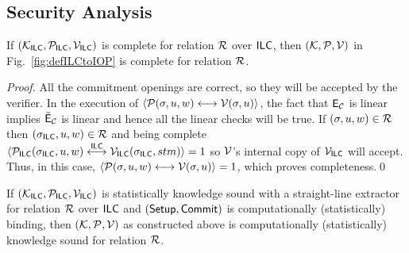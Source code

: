\subsection{Security Analysis}
\label{sec:IPCPsec}
    \begin{theorem}[Completeness]
    If $(\mathcal{K}_{\mathsf{ILC}},\mathcal{P}_{\mathsf{ILC}},\mathcal{V}_{\mathsf{ILC}})$ is complete for relation $\mathcal{R}$ over $\mathsf{ILC}$, then $(\mathcal{K},\mathcal{P},\mathcal{V})$ in Fig.~\ref{fig:defILCtoIOP} is complete for relation $\mathcal{R}$.
    \end{theorem}  
   \begin{proof}
All the commitment openings are correct, so they will be accepted by the verifier. In the execution of $\langle \mathcal{P}(\mathsf{\sigma},u,w)\longleftrightarrow\mathcal{V}(\mathsf{\sigma},u)\rangle$, the fact that $\mathsf{E}_{\mathcal{C}}$ is linear implies $\tilde{\mathsf{E}}_{\mathcal{C}}$ is linear and hence all the linear checks will be true. If $(\mathsf{\sigma},u,w)\in \mathcal{R}$ then $(\mathsf{\sigma}_{\mathsf{ILC}},u,w)\in \mathcal{R}$ and being complete $\langle \mathcal{P}_{\mathsf{ILC}}(\mathsf{\sigma}_{\mathsf{ILC}},u,w)\overset{\mathsf{ILC}}{\longleftrightarrow}\mathcal{V}_{\mathsf{ILC}}(\mathsf{\sigma}_{\mathsf{ILC}},stm)\rangle =1$ so $\mathcal{V}$'s internal copy of $\mathcal{V}_{\mathsf{ILC}}$ will accept. Thus, in this case, $\langle \mathcal{P}(\mathsf{\sigma},u,w)\longleftrightarrow\mathcal{V}(\mathsf{\sigma},u)\rangle=1$, which proves completeness.\qed
    \end{proof}
  
  
      \begin{theorem}\label{thm:sound}
    If $(\mathcal{K}_{\mathsf{ILC}},\mathcal{P}_{\mathsf{ILC}},\mathcal{V}_{\mathsf{ILC}})$ is statistically knowledge sound with a straight-line extractor for relation $\mathcal{R}$ over $\mathsf{ILC}$ and $(\mathsf{Setup},\mathsf{Commit})$ is computationally (statistically) binding, then $(\mathcal{K},\mathcal{P},\mathcal{V})$ as constructed above is computationally (statistically) knowledge sound for relation $\mathcal{R}$.
    \end{theorem}   

